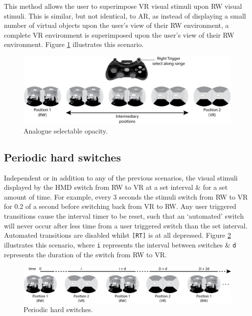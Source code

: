 \documentclass[oneside]{book}
\begin{document}
This method allows the user to superimpose VR visual stimuli upon RW visual stimuli. This is similar, but not identical, to AR, as instead of displaying a small number of virtual objects upon the user's view of their RW environment, a complete VR environment is superimposed upon the user's view of their RW environment. Figure \ref{scenario2} illustrates this scenario.

\begin{figure}[h]
	\begin{center}
		\includegraphics[width=.9\textwidth]{images/switching-analogue-with-controller.png}
		\caption{Analogue selectable opacity.}
		\label{scenario2}
	\end{center}
\end{figure}

\subsection{Periodic hard switches}
\label{subsub-periodic}
Independent or in addition to any of the previous scenarios, the visual stimuli displayed by the HMD switch from RW to VR at a set interval \& for a set amount of time. For example, every 3 seconds the stimuli switch from RW to VR for 0.2 of a second before switching back from VR to RW. Any user triggered transitions cause the interval timer to be reset, such that an `automated' switch will never occur after less time from a user triggered switch than the set interval. Automated transitions are disabled whilst \texttt{[RT]} is at all depressed. Figure \ref{scenariotimed} illustrates this scenario, where \texttt{i} represents the interval between switches \& \texttt{d} represents the duration of the switch from RW to VR.


\begin{figure}[h]
	\begin{center}
		\includegraphics[width=\textwidth]{images/timed-switch.png}
		\caption{Periodic hard switches.}
		\label{scenariotimed}
	\end{center}
\end{figure}
\end{document}
